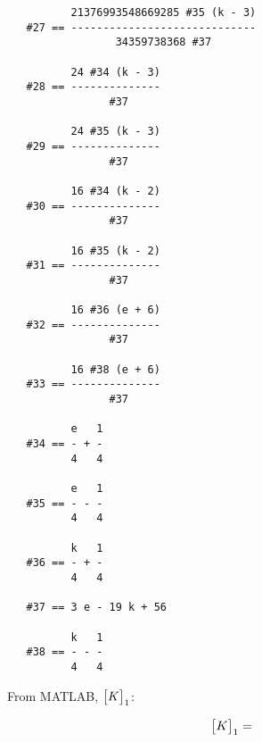 \documentclass[../main.tex]{subfiles}
\begin{document}
\begin{verbatim}
          21376993548669285 #35 (k - 3)
   #27 == -----------------------------
                 34359738368 #37

          24 #34 (k - 3)
   #28 == --------------
                #37

          24 #35 (k - 3)
   #29 == --------------
                #37

          16 #34 (k - 2)
   #30 == --------------
                #37

          16 #35 (k - 2)
   #31 == --------------
                #37

          16 #36 (e + 6)
   #32 == --------------
                #37

          16 #38 (e + 6)
   #33 == --------------
                #37

          e   1
   #34 == - + -
          4   4

          e   1
   #35 == - - -
          4   4

          k   1
   #36 == - + -
          4   4

   #37 == 3 e - 19 k + 56

          k   1
   #38 == - - -
          4   4

\end{verbatim}

From MATLAB, \(\mqty[K]_1\):

\[
    \mqty[K]_1 =  
\]
\end{document}

